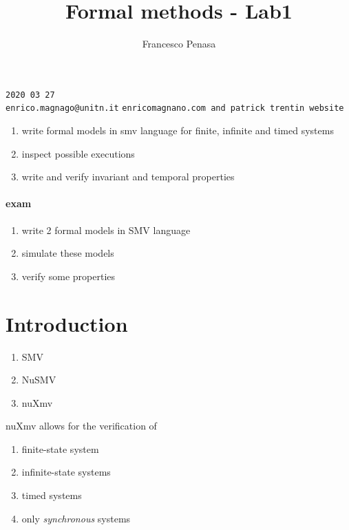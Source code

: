 \documentclass[11pt]{article}
\begin{document}
\author{Francesco Penasa}
\title{Formal methods - Lab1}
\maketitle

\medskip

\texttt{2020 03 27}\\
\texttt{enrico.magnago@unitn.it}
\texttt{enricomagnano.com and patrick trentin website}

\begin{enumerate}
	\item write formal models in smv language for finite, infinite and timed systems
	\item inspect possible executions
	\item write and verify invariant and temporal properties
\end{enumerate}


\paragraph{exam} %
\label{par:exam}
\begin{enumerate}
	\item write 2 formal models in SMV language
	\item simulate these models 
	\item verify some properties
\end{enumerate}

\section{Introduction} %
\label{sec:introduction}
\begin{enumerate}
	\item SMV
	\item NuSMV
	\item nuXmv
\end{enumerate}

nuXmv allows for the verification of
\begin{enumerate}
	\item finite-state system
	\item infinite-state systems
	\item timed systems
	\item only \textit{synchronous} systems
\end{enumerate}
\end{document}

